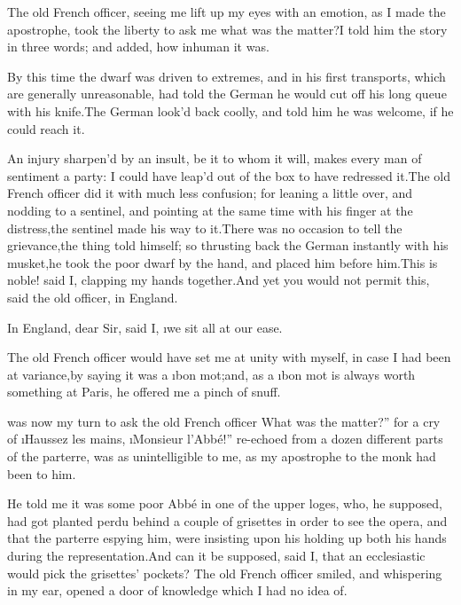\documentclass[twoside]{article}
\begin{document}
The old French officer, seeing me lift up my eyes with an emotion, as I
made the apostrophe, took the liberty to ask me what was the matter?\tsk I
told him the story in three words; and added, how inhuman it was.

By this time the dwarf was driven to extremes, and in his first
transports, which are generally unreasonable, had told the German he
would cut off his long queue with his knife.\tsk The German look’d back
coolly, and told him he was welcome, if he could reach it.

An injury sharpen’d by an insult, be it to whom it will, makes every man
of sentiment a party: I could have leap’d out of the box to have
redressed it.\tsk The old French officer did it with much less confusion; for
leaning a little over, and nodding to a sentinel, and pointing at the
same time with his finger at the distress,\tsk the sentinel made his way to
it.\tsk There was no occasion to tell the grievance,\tsk the thing told himself;
so thrusting back the German instantly with his musket,\tsk he took the poor
dwarf by the hand, and placed him before him.\tsk This is noble! said I,
clapping my hands together.\tsk And yet you would not permit this, said the
old officer, in England.

\tsk In England, dear Sir, said I, \i{we sit all at our ease}.

The old French officer would have set me at unity with myself, in case I
had been at variance,\tsk by saying it was a \i{bon mot};\tsk and, as a \i{bon mot}
is always worth something at Paris, he offered me a pinch of snuff.






 was now my turn to ask the old French officer \lqq What was the matter?”
for a cry of \lqq \i{Haussez les mains}, \i{Monsieur l’Abbé}!” re-echoed from a
dozen different parts of the parterre, was as unintelligible to me, as my
apostrophe to the monk had been to him.

He told me it was some poor Abbé in one of the upper loges, who, he
supposed, had got planted perdu behind a couple of grisettes in order to
see the opera, and that the parterre espying him, were insisting upon his
holding up both his hands during the representation.\tsk And can it be
supposed, said I, that an ecclesiastic would pick the grisettes’ pockets?
The old French officer smiled, and whispering in my ear, opened a door of
knowledge which I had no idea of.
\end{document}
